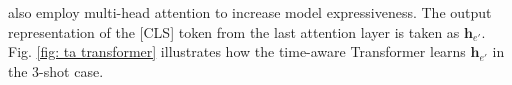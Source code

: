\documentclass[runningheads]{llncs}
\begin{document}
also employ multi-head attention to increase model expressiveness. 
The output representation of the [CLS] token from the last attention layer is taken as $\mathbf{h}_{e'}$. Fig. \ref{fig: ta transformer} illustrates how the time-aware Transformer learns $\mathbf{h}_{e'}$ in the 3-shot case.
\end{document}
